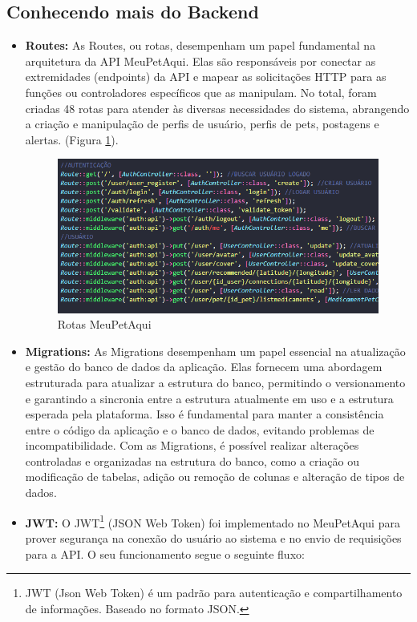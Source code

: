 \subsection{Conhecendo mais do Backend}
\begin{itemize}
    \item {\bf Routes:} As Routes, ou rotas, desempenham um papel fundamental na arquitetura da API MeuPetAqui. Elas são responsáveis por conectar as extremidades (endpoints) da API e mapear as solicitações HTTP para as funções ou controladores específicos que as manipulam. No total, foram criadas 48 rotas para atender às diversas necessidades do sistema, abrangendo a criação e manipulação de perfis de usuário, perfis de pets, postagens e alertas. (Figura \ref{fig:Routes}).
    
    \begin{figure}[htb]
     \centering
     \includegraphics[width=14cm]{arquivos/Figuras/routes.png}
     \caption{Rotas MeuPetAqui}
         \label{fig:Routes}
\end{figure}
    \item {\bf Migrations:} As Migrations desempenham um papel essencial na atualização e gestão do banco de dados da aplicação. Elas fornecem uma abordagem estruturada para atualizar a estrutura do banco, permitindo o versionamento e garantindo a sincronia entre a estrutura atualmente em uso e a estrutura esperada pela plataforma. Isso é fundamental para manter a consistência entre o código da aplicação e o banco de dados, evitando problemas de incompatibilidade. Com as Migrations, é possível realizar alterações controladas e organizadas na estrutura do banco, como a criação ou modificação de tabelas, adição ou remoção de colunas e alteração de tipos de dados.
    \newpage
    \item {\bf JWT:} O \gls{JWT}\footnote{JWT (Json Web Token) é um padrão para autenticação e compartilhamento de informações. Baseado no formato JSON.} (JSON Web Token) foi implementado no MeuPetAqui para prover segurança na conexão do usuário ao sistema e no envio de requisições para a API. O seu funcionamento segue o seguinte fluxo:

\end{itemize}
